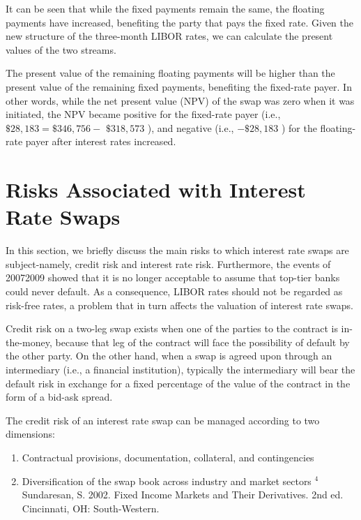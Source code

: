 \documentclass[11pt]{article}
\begin{document}
It can be seen that while the fixed payments remain the same, the floating payments have increased, benefiting the party that pays the fixed rate. Given the new structure of the three-month LIBOR rates, we can calculate the present values of the two streams.

The present value of the remaining floating payments will be higher than the present value of the remaining fixed payments, benefiting the fixed-rate payer. In other words, while the net present value (NPV) of the swap was zero when it was initiated, the NPV became positive for the fixed-rate payer (i.e., $\$ 28,183=\$ 346,756-$ $\$ 318,573$ ), and negative (i.e., $-\$ 28,183$ ) for the floating-rate payer after interest rates increased.

\section*{Risks Associated with Interest Rate Swaps}
In this section, we briefly discuss the main risks to which interest rate swaps are subject-namely, credit risk and interest rate risk. Furthermore, the events of 20072009 showed that it is no longer acceptable to assume that top-tier banks could never default. As a consequence, LIBOR rates should not be regarded as risk-free rates, a problem that in turn affects the valuation of interest rate swaps.

Credit risk on a two-leg swap exists when one of the parties to the contract is in-the-money, because that leg of the contract will face the possibility of default by the other party. On the other hand, when a swap is agreed upon through an intermediary (i.e., a financial institution), typically the intermediary will bear the default risk in exchange for a fixed percentage of the value of the contract in the form of a bid-ask spread.

The credit risk of an interest rate swap can be managed according to two dimensions:

\begin{enumerate}
  \item Contractual provisions, documentation, collateral, and contingencies

  \item Diversification of the swap book across industry and market sectors ${ }^{4}$ Sundaresan, S. 2002. Fixed Income Markets and Their Derivatives. 2nd ed. Cincinnati, OH: South-Western.

\end{enumerate}
\end{document}
